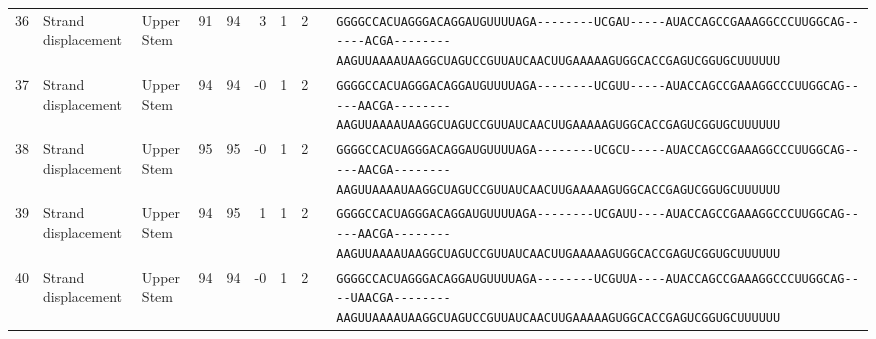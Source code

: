 \begin{tabular}{rllrrrrrcl}
 36 & Strand displacement & Upper Stem & 91 & 94 & 3 & 1 & 2 &  &
 \color{ucsfdarkgrey}\verb|GGGGCCACUAGGGACAGGAU|\color{ucsforange}\verb|GUUUUA|\color{ucsfblue}\verb|GA--------UCGAU-----|\color{ucsfpurple}\verb|AUACCAGCCGAAAGGCCCUUGGCAG|\color{ucsfblue}\verb|------ACGA--------AAGU|\color{ucsforange}\verb|UAAAAUAA|\color{ucsfnavy}\verb|GGCUAGUCC|\color{ucsforange}\verb|GUUAUCA|\color{ucsfteal}\verb|ACUUGAAAAAGU|\color{ucsforange}\verb|GGCACCGAGUCGGUGCUUUUUU| \\

 37 & Strand displacement & Upper Stem & 94 & 94 & -0 & 1 & 2 &  &
 \color{ucsfdarkgrey}\verb|GGGGCCACUAGGGACAGGAU|\color{ucsforange}\verb|GUUUUA|\color{ucsfblue}\verb|GA--------UCGUU-----|\color{ucsfpurple}\verb|AUACCAGCCGAAAGGCCCUUGGCAG|\color{ucsfblue}\verb|-----AACGA--------AAGU|\color{ucsforange}\verb|UAAAAUAA|\color{ucsfnavy}\verb|GGCUAGUCC|\color{ucsforange}\verb|GUUAUCA|\color{ucsfteal}\verb|ACUUGAAAAAGU|\color{ucsforange}\verb|GGCACCGAGUCGGUGCUUUUUU| \\

 38 & Strand displacement & Upper Stem & 95 & 95 & -0 & 1 & 2 &  &
 \color{ucsfdarkgrey}\verb|GGGGCCACUAGGGACAGGAU|\color{ucsforange}\verb|GUUUUA|\color{ucsfblue}\verb|GA--------UCGCU-----|\color{ucsfpurple}\verb|AUACCAGCCGAAAGGCCCUUGGCAG|\color{ucsfblue}\verb|-----AACGA--------AAGU|\color{ucsforange}\verb|UAAAAUAA|\color{ucsfnavy}\verb|GGCUAGUCC|\color{ucsforange}\verb|GUUAUCA|\color{ucsfteal}\verb|ACUUGAAAAAGU|\color{ucsforange}\verb|GGCACCGAGUCGGUGCUUUUUU| \\

 39 & Strand displacement & Upper Stem & 94 & 95 & 1 & 1 & 2 &  &
 \color{ucsfdarkgrey}\verb|GGGGCCACUAGGGACAGGAU|\color{ucsforange}\verb|GUUUUA|\color{ucsfblue}\verb|GA--------UCGAUU----|\color{ucsfpurple}\verb|AUACCAGCCGAAAGGCCCUUGGCAG|\color{ucsfblue}\verb|-----AACGA--------AAGU|\color{ucsforange}\verb|UAAAAUAA|\color{ucsfnavy}\verb|GGCUAGUCC|\color{ucsforange}\verb|GUUAUCA|\color{ucsfteal}\verb|ACUUGAAAAAGU|\color{ucsforange}\verb|GGCACCGAGUCGGUGCUUUUUU| \\

 40 & Strand displacement & Upper Stem & 94 & 94 & -0 & 1 & 2 &  &
 \color{ucsfdarkgrey}\verb|GGGGCCACUAGGGACAGGAU|\color{ucsforange}\verb|GUUUUA|\color{ucsfblue}\verb|GA--------UCGUUA----|\color{ucsfpurple}\verb|AUACCAGCCGAAAGGCCCUUGGCAG|\color{ucsfblue}\verb|----UAACGA--------AAGU|\color{ucsforange}\verb|UAAAAUAA|\color{ucsfnavy}\verb|GGCUAGUCC|\color{ucsforange}\verb|GUUAUCA|\color{ucsfteal}\verb|ACUUGAAAAAGU|\color{ucsforange}\verb|GGCACCGAGUCGGUGCUUUUUU| \\


\end{tabular}
